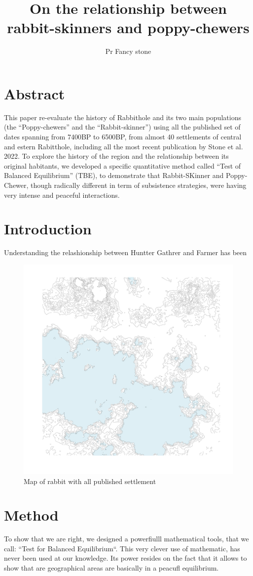 \documentclass[10pt]{paper}
\title{ On the relationship between rabbit-skinners and poppy-chewers }
\author{Pr Fancy stone}
\begin{document}
\section*{Abstract}
This paper re-evaluate the history of Rabbithole and its two main populations (the ``Poppy-chewers'' and the ``Rabbit-skinner'') using all the published set of dates spanning from 7400BP to 6500BP, from almost 40 settlements of central and estern Rabitthole, including all the most recent publication by Stone et al. 2022. To explore the history of the region and the relationship between its original habitants, we developed a specific quantitative method called ``Test of Balanced Equilibrium'' (TBE), to demonstrate that Rabbit-SKinner and Poppy-Chewer, though radically different in term of subsistence strategies, were having very intense and peaceful interactions.

\section{Introduction}
Understanding the relashionship between Huntter Gathrer and Farmer has been  

\begin{figure}
    \centering
    \includegraphics[width=.65\textwidth]{all}
    \caption{Map of rabbit with all published settlement}
    \label{fig:newage}
\end{figure}

\section{Method}
To show that we are right, we designed a powerfiulll mathematical tools, that we call: ``Test for Balanced Equilibrium``. This very clever use of mathematic, has never been used at our knowledge. Its power resides on the fact that it allows to show that are geographical areas  are basically in a peacufl equilibrium.
\end{document}

